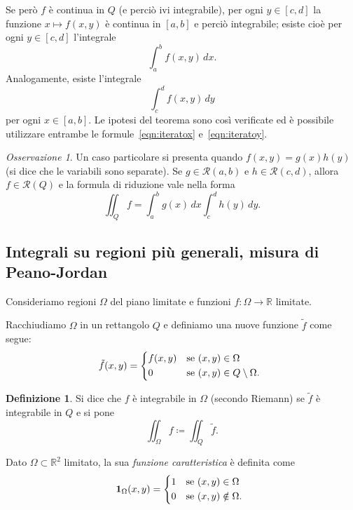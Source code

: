 \documentclass[a4paper]{book}
\numberwithin{equation}{section}
\theoremstyle{plain}
\theoremstyle{definition}
\newtheorem{defn}{Definizione}[section]
\theoremstyle{remark}
\newtheorem{oss}{Osservazione}[section]
\theoremstyle{example}
\begin{document}
		Se però $f$ è continua in $Q$ (e perciò ivi integrabile), per ogni $y \in [c,d]$ la funzione $x \mapsto f(x, y)$ è continua in $[a, b]$ e perciò integrabile; esiste cioè per ogni $y \in [c, d]$ l'integrale
		\begin{equation*}
			\int_a^b f(x,y) \, dx.
		\end{equation*}
		Analogamente, esiste l'integrale
		\begin{equation*}
			\int_c^d f(x,y) \, dy
		\end{equation*}
		per ogni $x \in [a, b]$. Le ipotesi del teorema sono così verificate ed è possibile utilizzare entrambe le formule~\eqref{eqn:iteratox} e~\eqref{eqn:iteratoy}.

		\begin{oss}
			Un caso particolare si presenta quando $f(x,y) = g(x)h(y)$ (si dice che le variabili sono separate). Se $g \in \mathcal{R}(a,b)$ e $h \in \mathcal{R}(c, d)$, allora $f \in \mathcal{R}(Q)$ e la formula di riduzione vale nella forma
			\begin{equation}
				\iint_Q f = \int_a^b g(x) \, dx \int_c^d h(y)\,dy.
			\end{equation}
		\end{oss}

		\subsection{Integrali su regioni più generali, misura di Peano-Jordan}
		Consideriamo regioni $\Omega$ del piano limitate e funzioni $f \colon \Omega \to \mathbb{R}$ limitate.

		Racchiudiamo $\Omega$ in un rettangolo $Q$ e definiamo una nuove funzione $\tilde{f}$ come segue:
		\begin{equation}
			\tilde{f}(x, y) = \begin{dcases*}
			f(x,y) &se $(x, y) \in \Omega$ \\
			0 &se $(x, y) \in Q\setminus \Omega$.
		\end{dcases*}
	\end{equation}

	\begin{defn}
		Si dice che $f$ è integrabile in $\Omega$ (secondo Riemann) se $\tilde{f}$ è integrabile in $Q$ e si pone
		\begin{equation*}
			\iint_{\Omega} f \coloneqq \iint_Q \tilde{f}.
		\end{equation*}
	\end{defn}

	Dato $\Omega \subset \mathbb{R}^2$ limitato, la sua \emph{funzione caratteristica} è definita come
	\begin{equation*}
		\mathbf{1}_{\Omega}(x, y) = \begin{dcases*}
		1 &se $(x, y) \in \Omega$ \\
		0 &se $(x, y) \notin \Omega$.
	\end{dcases*}
\end{equation*}
\end{document}
